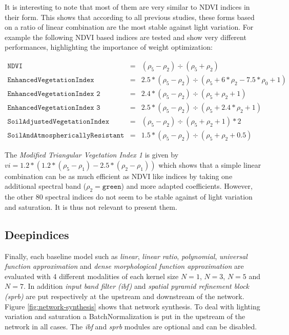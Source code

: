 \documentclass[../thesis.tex]{subfiles}
\begin{document}
	It is interesting to note that most of them are very similar to NDVI indices in their form. This shows that according to all previous studies, these forms based on a ratio of linear combination are the most stable against light variation. For example the following NDVI based indices are tested and show very different performances, highlighting the importance of weight  {optimization}:
	
	\begin{eqnarray}
	\nonumber \texttt{NDVI} &=& (\rho_5-\rho_2) \div (\rho_5+\rho_2) \\
	\nonumber \texttt{EnhancedVegetationIndex} &=& 2.5*(\rho_5-\rho_2) \div (\rho_5+6*\rho_2-7.5*\rho_0+1) \\
	\nonumber \texttt{EnhancedVegetationIndex 2} &=& 2.4*(\rho_5-\rho_2) \div (\rho_5+\rho_2+1) \\
	\nonumber \texttt{EnhancedVegetationIndex 3} &=& 2.5*(\rho_5-\rho_2) \div (\rho_5+2.4*\rho_2+1) \\
	\nonumber \texttt{SoilAdjustedVegetationIndex} &=& (\rho_5-\rho_2) \div (\rho_5+\rho_2+1) * 2 \\
	\nonumber \texttt{SoilAndAtmosphericallyResistant VI 3} &=& 1.5*(\rho_5-\rho_2) \div (\rho_5+\rho_2+0.5)
	\end{eqnarray}
	
	The \textit{Modified Triangular Vegetation Index 1} is given by $vi = 1.2*(1.2*(\rho_5-\rho_1)-2.5*(\rho_2-\rho_1))$ which shows that a simple linear combination can be as much efficient as NDVI like indices by taking one additional spectral band ($\rho_2 = \texttt{green}$) and more adapted coefficients.
	However, the other 80 spectral indices do not seem to be stable against of light variation and saturation. It is thus not relevant to present them.
	
	\newpage
	\subsection{Deepindices} Finally, each baseline model such as \textit{linear}, \textit{linear ratio}, \textit{polynomial}, \textit{universal function approximation} and \textit{dense morphological function approximation} are evaluated with 4 different modalities of each kernel size $N=1$, $N=3$, $N=5$ and $N=7$. In addition \textit{input band filter (ibf)} and \textit{spatial pyramid refinement block (sprb)} are put respectively at the upstream and downstream of the network. Figure \ref{fig:network-synthesis} shows that network synthesis. To deal with lighting variation and saturation a BatchNormalization is put in the upstream of the network in all cases. The \textit{ibf} and \textit{sprb} modules are optional and can be disabled.
	
\end{document}

